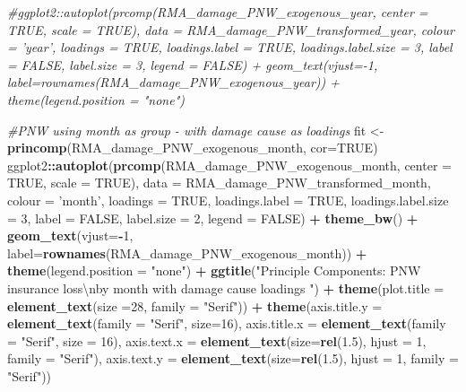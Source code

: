 \documentclass[]{article}
\newenvironment{Shaded}{\begin{snugshade}}{\end{snugshade}}
\newcommand{\CharTok}[1]{\textcolor[rgb]{0.31,0.60,0.02}{#1}}
\newcommand{\CommentTok}[1]{\textcolor[rgb]{0.56,0.35,0.01}{\textit{#1}}}
\newcommand{\DataTypeTok}[1]{\textcolor[rgb]{0.13,0.29,0.53}{#1}}
\newcommand{\DecValTok}[1]{\textcolor[rgb]{0.00,0.00,0.81}{#1}}
\newcommand{\FloatTok}[1]{\textcolor[rgb]{0.00,0.00,0.81}{#1}}
\newcommand{\KeywordTok}[1]{\textcolor[rgb]{0.13,0.29,0.53}{\textbf{#1}}}
\newcommand{\NormalTok}[1]{#1}
\newcommand{\OperatorTok}[1]{\textcolor[rgb]{0.81,0.36,0.00}{\textbf{#1}}}
\newcommand{\OtherTok}[1]{\textcolor[rgb]{0.56,0.35,0.01}{#1}}
\newcommand{\StringTok}[1]{\textcolor[rgb]{0.31,0.60,0.02}{#1}}
\begin{document}
\begin{Shaded}
\begin{Highlighting}[]
\CommentTok{#ggplot2::autoplot(prcomp(RMA_damage_PNW_exogenous_year, center = TRUE, scale = TRUE), data = RMA_damage_PNW_transformed_year, colour = 'year', loadings = TRUE, loadings.label = TRUE, loadings.label.size  = 3, label = FALSE, label.size = 3, legend = FALSE) + geom_text(vjust=-1, label=rownames(RMA_damage_PNW_exogenous_year)) + theme(legend.position = "none")}

\CommentTok{#PNW using month as group - with damage cause as loadings}
\NormalTok{fit <-}\StringTok{ }\KeywordTok{princomp}\NormalTok{(RMA_damage_PNW_exogenous_month, }\DataTypeTok{cor=}\OtherTok{TRUE}\NormalTok{)}
\NormalTok{ggplot2}\OperatorTok{::}\KeywordTok{autoplot}\NormalTok{(}\KeywordTok{prcomp}\NormalTok{(RMA_damage_PNW_exogenous_month, }\DataTypeTok{center =} \OtherTok{TRUE}\NormalTok{, }\DataTypeTok{scale =} \OtherTok{TRUE}\NormalTok{),  }\DataTypeTok{data =}\NormalTok{ RMA_damage_PNW_transformed_month, }\DataTypeTok{colour =} \StringTok{'month'}\NormalTok{, }\DataTypeTok{loadings =} \OtherTok{TRUE}\NormalTok{, }\DataTypeTok{loadings.label =} \OtherTok{TRUE}\NormalTok{, }\DataTypeTok{loadings.label.size  =} \DecValTok{3}\NormalTok{, }\DataTypeTok{label =} \OtherTok{FALSE}\NormalTok{, }\DataTypeTok{label.size =} \DecValTok{2}\NormalTok{, }\DataTypeTok{legend =} \OtherTok{FALSE}\NormalTok{)  }\OperatorTok{+}\StringTok{ }\KeywordTok{theme_bw}\NormalTok{()   }\OperatorTok{+}\StringTok{ }\KeywordTok{geom_text}\NormalTok{(}\DataTypeTok{vjust=}\OperatorTok{-}\DecValTok{1}\NormalTok{, }\DataTypeTok{label=}\KeywordTok{rownames}\NormalTok{(RMA_damage_PNW_exogenous_month)) }\OperatorTok{+}\StringTok{ }\KeywordTok{theme}\NormalTok{(}\DataTypeTok{legend.position =} \StringTok{"none"}\NormalTok{) }\OperatorTok{+}\StringTok{ }\KeywordTok{ggtitle}\NormalTok{(}\StringTok{"Principle Components: PNW insurance loss}\CharTok{\textbackslash{}n}\StringTok{by month with damage cause loadings "}\NormalTok{) }\OperatorTok{+}\StringTok{ }\KeywordTok{theme}\NormalTok{(}\DataTypeTok{plot.title =} \KeywordTok{element_text}\NormalTok{(}\DataTypeTok{size =}\DecValTok{28}\NormalTok{, }\DataTypeTok{family =} \StringTok{"Serif"}\NormalTok{)) }\OperatorTok{+}\StringTok{ }\KeywordTok{theme}\NormalTok{(}\DataTypeTok{axis.title.y =} \KeywordTok{element_text}\NormalTok{(}\DataTypeTok{family =} \StringTok{"Serif"}\NormalTok{, }\DataTypeTok{size=}\DecValTok{16}\NormalTok{), }\DataTypeTok{axis.title.x =} \KeywordTok{element_text}\NormalTok{(}\DataTypeTok{family =} \StringTok{"Serif"}\NormalTok{, }\DataTypeTok{size =} \DecValTok{16}\NormalTok{), }\DataTypeTok{axis.text.x =} \KeywordTok{element_text}\NormalTok{(}\DataTypeTok{size=}\KeywordTok{rel}\NormalTok{(}\FloatTok{1.5}\NormalTok{), }\DataTypeTok{hjust =} \DecValTok{1}\NormalTok{, }\DataTypeTok{family =} \StringTok{"Serif"}\NormalTok{), }\DataTypeTok{axis.text.y =} \KeywordTok{element_text}\NormalTok{(}\DataTypeTok{size=}\KeywordTok{rel}\NormalTok{(}\FloatTok{1.5}\NormalTok{), }\DataTypeTok{hjust =} \DecValTok{1}\NormalTok{, }\DataTypeTok{family =} \StringTok{"Serif"}\NormalTok{))}
\end{Highlighting}
\end{Shaded}
\end{document}
